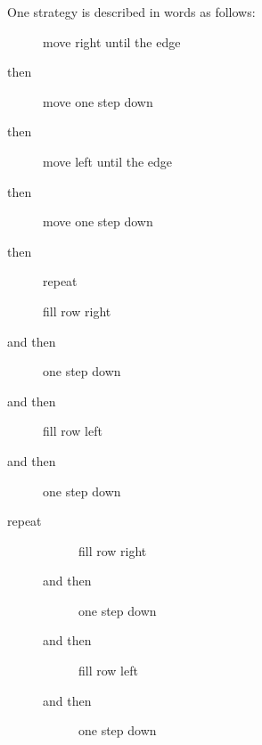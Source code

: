 \documentclass[10pt]{beamer}
\begin{document}
\begin{frame}[fragile]
  One strategy is described in words as follows:
  \begin{description}
      \item[] move right until the edge
      \item[then] move one step down
      \item[then] move left until the edge
      \item[then] move one step down
      \item[then] repeat
  \end{description}
\end{frame}
\begin{frame}[fragile]
  \begin{description}
      \item[] fill row right
      \item[and then] one step down
      \item[and then] fill row left
      \item[and then] one step down
  \end{description}
\end{frame}
\begin{frame}[fragile]
  \begin{description}
    \item[repeat]
    \item[]
      \begin{description}
      \item[] fill row right
      \item[and then] one step down
      \item[and then] fill row left
      \item[and then] one step down
  \end{description}
  \end{description}
\end{frame}
\end{document}
